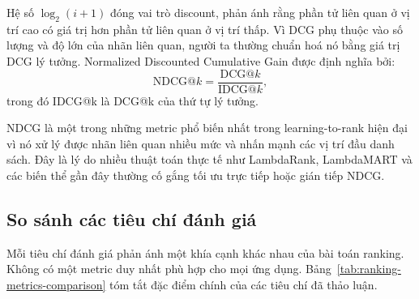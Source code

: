 Hệ số \(\log_2(i+1)\) đóng vai trò discount, phản ánh rằng phần tử liên quan ở vị trí cao có giá trị hơn phần tử liên quan ở vị trí thấp. Vì DCG phụ thuộc vào số lượng và độ lớn của nhãn liên quan, người ta thường chuẩn hoá nó bằng giá trị DCG lý tưởng. Normalized Discounted Cumulative Gain được định nghĩa bởi:
\begin{equation}
    \text{NDCG@}k
    =
    \frac{\text{DCG@}k}{\text{IDCG@}k},
    \label{eq:discussion-ndcg-at-k}
\end{equation}
trong đó IDCG@k là DCG@k của thứ tự lý tưởng.

NDCG là một trong những metric phổ biến nhất trong learning-to-rank hiện đại vì nó xử lý được nhãn liên quan nhiều mức và nhấn mạnh các vị trí đầu danh sách. Đây là lý do nhiều thuật toán thực tế như LambdaRank, LambdaMART và các biến thể gần đây thường cố gắng tối ưu trực tiếp hoặc gián tiếp NDCG.

\subsection{So sánh các tiêu chí đánh giá}

Mỗi tiêu chí đánh giá phản ánh một khía cạnh khác nhau của bài toán ranking. Không có một metric duy nhất phù hợp cho mọi ứng dụng. Bảng~\ref{tab:ranking-metrics-comparison} tóm tắt đặc điểm chính của các tiêu chí đã thảo luận.

